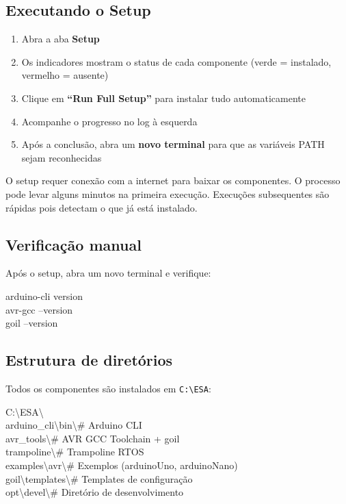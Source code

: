 \documentclass[12pt,a4paper]{article}
\begin{document}
\subsection{Executando o Setup}

\begin{enumerate}[nosep]
  \item Abra a aba \textbf{Setup}
  \item Os indicadores mostram o status de cada componente (verde = instalado, vermelho = ausente)
  \item Clique em \textbf{``Run Full Setup''} para instalar tudo automaticamente
  \item Acompanhe o progresso no log à esquerda
  \item Após a conclusão, abra um \textbf{novo terminal} para que as variáveis PATH sejam reconhecidas
\end{enumerate}

\begin{notabox}[Importante]
O setup requer conexão com a internet para baixar os componentes. O processo pode levar alguns minutos na primeira execução. Execuções subsequentes são rápidas pois detectam o que já está instalado.
\end{notabox}

\subsection{Verificação manual}

Após o setup, abra um novo terminal e verifique:

\begin{codigobox}
arduino-cli version\\
avr-gcc --version\\
goil --version
\end{codigobox}

\subsection{Estrutura de diretórios}

Todos os componentes são instalados em \texttt{C:\textbackslash ESA}:

\begin{codigobox}
C:\textbackslash ESA\textbackslash\\
\quad arduino\_cli\textbackslash bin\textbackslash\quad\quad\# Arduino CLI\\
\quad avr\_tools\textbackslash\quad\quad\quad\quad\quad\quad\# AVR GCC Toolchain + goil\\
\quad trampoline\textbackslash\quad\quad\quad\quad\quad\# Trampoline RTOS\\
\quad\quad examples\textbackslash avr\textbackslash\quad\quad\# Exemplos (arduinoUno, arduinoNano)\\
\quad\quad goil\textbackslash templates\textbackslash\quad\# Templates de configuração\\
\quad\quad opt\textbackslash devel\textbackslash\quad\quad\quad\# Diretório de desenvolvimento\\
\end{codigobox}
\end{document}
